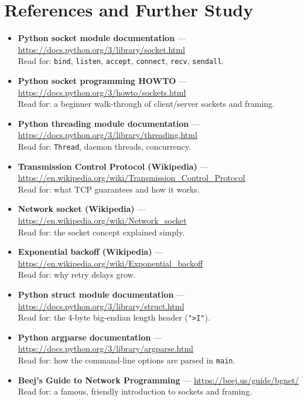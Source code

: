 \documentclass[11pt,a4paper]{report}
\begin{document}
\section{References and Further Study}
\begin{itemize}
  \item \textbf{Python socket module documentation} ---
        \url{https://docs.python.org/3/library/socket.html}\\
        Read for: \texttt{bind}, \texttt{listen}, \texttt{accept},
        \texttt{connect}, \texttt{recv}, \texttt{sendall}.
  \item \textbf{Python socket programming HOWTO} ---
        \url{https://docs.python.org/3/howto/sockets.html}\\
        Read for: a beginner walk-through of client/server sockets and framing.
  \item \textbf{Python threading module documentation} ---
        \url{https://docs.python.org/3/library/threading.html}\\
        Read for: \texttt{Thread}, daemon threads, concurrency.
  \item \textbf{Transmission Control Protocol (Wikipedia)} ---
        \url{https://en.wikipedia.org/wiki/Transmission_Control_Protocol}\\
        Read for: what TCP guarantees and how it works.
  \item \textbf{Network socket (Wikipedia)} ---
        \url{https://en.wikipedia.org/wiki/Network_socket}\\
        Read for: the socket concept explained simply.
  \item \textbf{Exponential backoff (Wikipedia)} ---
        \url{https://en.wikipedia.org/wiki/Exponential_backoff}\\
        Read for: why retry delays grow.
  \item \textbf{Python struct module documentation} ---
        \url{https://docs.python.org/3/library/struct.html}\\
        Read for: the 4-byte big-endian length header (\texttt{">I"}).
  \item \textbf{Python argparse documentation} ---
        \url{https://docs.python.org/3/library/argparse.html}\\
        Read for: how the command-line options are parsed in \texttt{main}.
  \item \textbf{Beej's Guide to Network Programming} ---
        \url{https://beej.us/guide/bgnet/}\\
        Read for: a famous, friendly introduction to sockets and framing.
\end{itemize}
\end{document}
